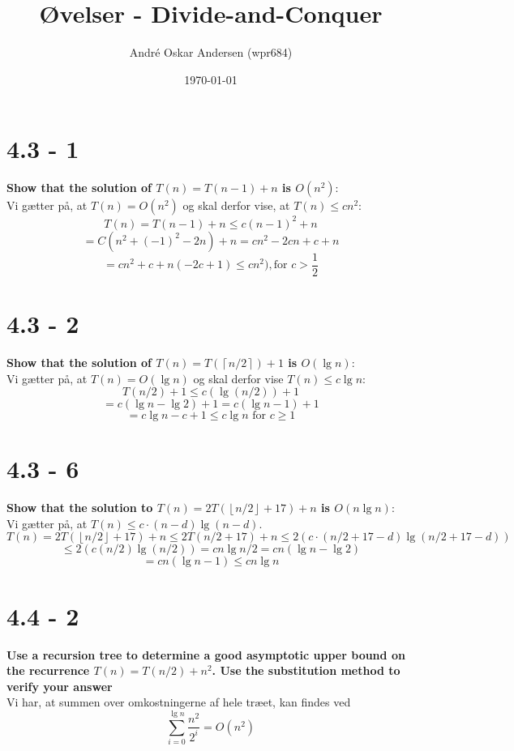 \documentclass{report}
\title{Øvelser - Divide-and-Conquer}
\author{André Oskar Andersen (wpr684)}
\date{\today}
\begin{document}
\maketitle

\section*{4.3 - 1}
\textbf{Show that the solution of $T(n) = T(n - 1) + n$ is $O(n^2)$}: \\
Vi gætter på, at $T(n) = O(n^2)$ og skal derfor vise, at $T(n) \leq cn^2$:
$$T(n) = T(n - 1) + n \leq c(n - 1)^2 + n$$
$$= C(n^2 + (-1)^2 - 2n) + n = cn^2 - 2cn + c + n$$
$$ = cn^2 + c + n(-2c + 1) \leq cn^2), \text{for $c > \frac{1}{2}$}$$

\section*{4.3 - 2}
\textbf{Show that the solution of $T(n) = T(\left \lceil{n/2}\right \rceil) + 1$ is $O(\lg n)$}: \\
Vi gætter på, at $T(n) = O(\lg n)$ og skal derfor vise $T(n) \leq c \lg n$:
$$T(n/2) + 1 \leq c(\lg(n/2)) + 1 $$
$$ = c(\lg n - \lg 2) + 1 = c(\lg n - 1) + 1 $$
$$ = c \lg n - c + 1 \leq c \lg n \text{ for $c \geq 1$}$$

\section*{4.3 - 6}
\textbf{Show that the solution to $T(n) = 2T(\left \lfloor{n/2}\right \rfloor + 17) + n$ is $O(n \lg n)$}: \\
Vi gætter på, at $T(n) \leq c \cdot (n - d) \lg (n - d)$. \\
$$T(n) = 2T(\left \lfloor{n/2}\right \rfloor + 17) + n \leq 2T(n/2 + 17) + n \leq 2(c \cdot (n/2 + 17 - d) \lg(n/2 + 17 - d))$$
$$\leq 2(c(n/2) \lg (n/2)) = cn \lg n/2 = cn(\lg n - \lg 2)$$
$$= cn(\lg n - 1) \leq cn \lg n$$

\section*{4.4 - 2}
\textbf{Use a recursion tree to determine a good asymptotic upper bound on the recurrence $T(n) = T(n/2) + n^2$. Use the substitution method to verify your answer} \\
Vi har, at summen over omkostningerne af hele træet, kan findes ved
$$\sum^{\lg n} _{i = 0} \frac{n^2}{2^i} = O(n^2)$$
\end{document}

